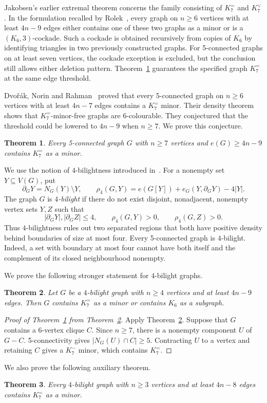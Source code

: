 \documentclass[11pt]{article}
\newtheorem{theorem}{Theorem}[section]
\theoremstyle{remark}
\numberwithin{equation}{section}
\newcommand{\Ke}{K_7^{=}}
\newcommand{\dd}{\partial}
\begin{document}
Jakobsen's earlier extremal theorem concerns the family consisting of $\Ke$ and $K_7^{\vee}$. In the formulation recalled by Rolek~\cite{Rol20}, every graph on $n\ge6$ vertices with at least $4n-9$ edges either contains one of these two graphs as a minor or is a $(K_6,3)$-cockade. Such a cockade is obtained recursively from copies of $K_6$ by identifying triangles in two previously constructed graphs. For 5-connected graphs on at least seven vertices, the cockade exception is excluded, but the conclusion still allows either deletion pattern. Theorem~\ref{thm:main} guarantees the specified graph $\Ke$ at the same edge threshold.

Dvo\v r\'ak, Norin and Rahman~\cite[Theorem~1.3]{DNR26} proved that every 5-connected graph on $n\ge6$ vertices with at least $4n-7$ edges contains a $\Ke$ minor. Their density theorem shows that $\Ke$-minor-free graphs are 6-colourable. They conjectured that the threshold could be lowered to $4n-9$ when $n\ge7$. We prove this conjecture.
\begin{theorem}\label{thm:main}
Every 5-connected graph $G$ with $n\ge7$ vertices and $e(G)\ge4n-9$ contains $\Ke$ as a minor.
\end{theorem}
We use the notion of $4$-bilightness introduced in~\cite{DNR26}. For a nonempty set $Y\subseteq V(G)$, put
\[
\dd_G Y=N_G(Y)\setminus Y,\qquad \rho_4(G,Y)=e(G[Y])+e_G(Y,\dd_GY)-4|Y|.
\]
The graph $G$ is \emph{$4$-bilight} if there do not exist disjoint, nonadjacent, nonempty vertex sets $Y,Z$ such that
\[
|\dd_GY|,|\dd_GZ|\le4,\qquad \rho_4(G,Y)>0,\qquad \rho_4(G,Z)>0.
\]
Thus $4$-bilightness rules out two separated regions that both have positive density behind boundaries of size at most four. Every 5-connected graph is $4$-bilight. Indeed, a set with boundary at most four cannot have both itself and the complement of its closed neighbourhood nonempty.

We prove the following stronger statement for $4$-bilight graphs.
\begin{theorem}\label{thm:bilight}
Let $G$ be a $4$-bilight graph with $n\ge4$ vertices and at least $4n-9$ edges. Then $G$ contains $\Ke$ as a minor or contains $K_6$ as a subgraph.
\end{theorem}
\begin{proof}[Proof of Theorem~\ref{thm:main} from Theorem~\ref{thm:bilight}]
Apply Theorem~\ref{thm:bilight}. Suppose that $G$ contains a 6-vertex clique $C$. Since $n\ge7$, there is a nonempty component $U$ of $G-C$. 5-connectivity gives $|N_G(U)\cap C|\ge5$. Contracting $U$ to a vertex and retaining $C$ gives a $K_7^{-}$ minor, which contains $\Ke$.
\end{proof}
We also prove the following auxiliary theorem.
\begin{theorem}\label{thm:aux}
Every $4$-bilight graph with $n\ge3$ vertices and at least $4n-8$ edges contains $\Ke$ as a minor.
\end{theorem}
\end{document}
